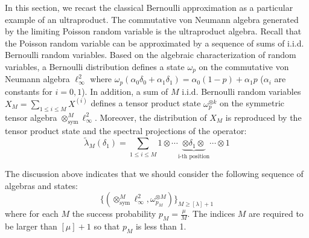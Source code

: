 \documentclass[a4paper,11pt]{article}
\theoremstyle{definition}
\numberwithin{equation}{section}
\begin{document}
In this section, we recast the classical Bernoulli approximation as a particular example of an ultraproduct. The commutative von Neumann algebra generated by the limiting Poisson random variable is the ultraproduct algebra. Recall that the Poisson random variable can be approximated by a sequence of sums of i.i.d. Bernoulli random variables. Based on the algebraic characterization of random variables, a Bernoulli distribution defines a state $\omega_p$ on the commutative von Neumann algebra $\ell_\infty^2$ where $\omega_p(\alpha_0\delta_0 + \alpha_1\delta_1) = \alpha_0(1-p) + \alpha_1 p$ ($\alpha_i$ are constants for $i = 0,1$). In addition, a sum of $M$ i.i.d. Bernoulli random variables $X_M = \sum_{1\leq i \leq M}X^{(i)}$ defines a tensor product state $\omega_p^{\otimes k}$ on the symmetric tensor algebra $\otimes_\text{sym}^M \ell_\infty^2$. Moreover, the distribution of $X_M$ is reproduced by the tensor product state and the spectral projections of the operator:
\begin{equation}
    \widetilde{\lambda}_M(\delta_1) = \sum_{1\leq i \leq M}1\otimes\cdots\underbrace{\otimes \delta_1\otimes}_\text{i-th position}\cdots\otimes 1
\end{equation}

The discussion above indicates that we should consider the following sequence of algebras and states:
\begin{equation}
    \{(\otimes_\text{sym}^M \ell_\infty^2, \omega_{p_M}^{\otimes M})\}_{M\geq [\lambda]+1}
\end{equation}
where for each $M$ the success probability $p_M = \frac{\mu}{M}$. The indices $M$ are required to be larger than $[\mu]+1$ so that $p_M$ is less than 1. 
\end{document}
